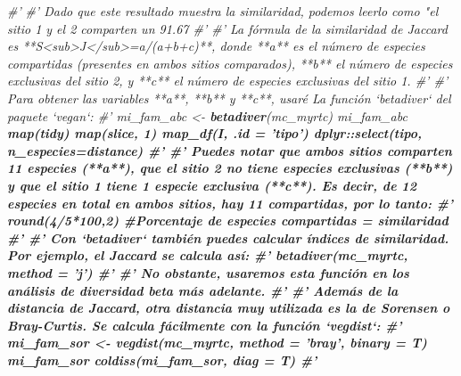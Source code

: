 \documentclass[11pt,]{article}
\newenvironment{Shaded}{\begin{snugshade}}{\end{snugshade}}
\newcommand{\KeywordTok}[1]{\textcolor[rgb]{0.13,0.29,0.53}{\textbf{#1}}}
\newcommand{\DataTypeTok}[1]{\textcolor[rgb]{0.13,0.29,0.53}{#1}}
\newcommand{\DecValTok}[1]{\textcolor[rgb]{0.00,0.00,0.81}{#1}}
\newcommand{\StringTok}[1]{\textcolor[rgb]{0.31,0.60,0.02}{#1}}
\newcommand{\CommentTok}[1]{\textcolor[rgb]{0.56,0.35,0.01}{\textit{#1}}}
\newcommand{\OperatorTok}[1]{\textcolor[rgb]{0.81,0.36,0.00}{\textbf{#1}}}
\newcommand{\NormalTok}[1]{#1}
\begin{document}
\begin{Shaded}
\begin{Highlighting}[]
{{{{\CommentTok{#'}
\CommentTok{#' Dado que este resultado muestra la similaridad, podemos leerlo como "el sitio 1 y el 2 comparten un 91.67%
\CommentTok{#' }
\CommentTok{#' La fórmula de la similaridad de Jaccard es **S<sub>J</sub>=a/(a+b+c)**, donde **a** es el número de especies compartidas (presentes en ambos sitios comparados), **b** el número de especies exclusivas del sitio 2, y **c** el número de especies exclusivas del sitio 1.}
\CommentTok{#' }
\CommentTok{#' Para obtener las variables **a**, **b** y **c**, usaré La función `betadiver` del paquete `vegan`:}
\CommentTok{#' }
\NormalTok{mi_fam_abc <-}\StringTok{ }\KeywordTok{betadiver}\NormalTok{(mc_myrtc) }
\NormalTok{mi_fam_abc }\OperatorTok{%
\StringTok{  }\KeywordTok{map}\NormalTok{(tidy) }\OperatorTok{%
\StringTok{  }\KeywordTok{map}\NormalTok{(slice, }\DecValTok{1}\NormalTok{) }\OperatorTok{%
\StringTok{  }\KeywordTok{map_df}\NormalTok{(I, }\DataTypeTok{.id =} \StringTok{'tipo'}\NormalTok{) }\OperatorTok{%
\StringTok{  }\NormalTok{dplyr}\OperatorTok{::}\KeywordTok{select}\NormalTok{(tipo, }\DataTypeTok{n_especies=}\NormalTok{distance)}
\CommentTok{#' }
\CommentTok{#' Puedes notar que ambos sitios comparten 11 especies (**a**), que el sitio 2 no tiene especies exclusivas (**b**) y que el sitio 1 tiene 1 especie exclusiva (**c**). Es decir, de 12 especies en total en ambos sitios, hay 11 compartidas, por lo tanto:}
\CommentTok{#' }
\KeywordTok{round}\NormalTok{(}\DecValTok{4}\OperatorTok{/}\DecValTok{5}\OperatorTok{*}\DecValTok{100}\NormalTok{,}\DecValTok{2}\NormalTok{) }\CommentTok{#Porcentaje de especies compartidas = similaridad}
\CommentTok{#' }
\CommentTok{#' Con `betadiver` también puedes calcular índices de similaridad. Por ejemplo, el Jaccard se calcula así:}
\CommentTok{#' }
\KeywordTok{betadiver}\NormalTok{(mc_myrtc, }\DataTypeTok{method =} \StringTok{'j'}\NormalTok{) }\OperatorTok{%
\CommentTok{#' }
\CommentTok{#' No obstante, usaremos esta función en los análisis de diversidad beta más adelante.}
\CommentTok{#' }
\CommentTok{#' Además de la distancia de Jaccard, otra distancia muy utilizada es la de Sorensen o Bray-Curtis. Se calcula fácilmente con la función `vegdist`:}
\CommentTok{#' }
\NormalTok{mi_fam_sor <-}\StringTok{ }\KeywordTok{vegdist}\NormalTok{(mc_myrtc, }\DataTypeTok{method =} \StringTok{'bray'}\NormalTok{, }\DataTypeTok{binary =}\NormalTok{ T)}
\NormalTok{mi_fam_sor }\OperatorTok{%
\KeywordTok{coldiss}\NormalTok{(mi_fam_sor, }\DataTypeTok{diag =}\NormalTok{ T)}
\CommentTok{#' }
}}}}}}}}}}}
\end{Highlighting}
\end{Shaded}
\end{document}
